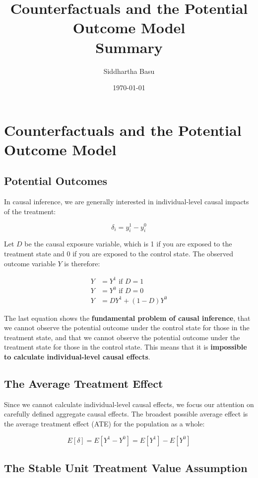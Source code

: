 \documentclass[12 pt, leqno]{article}
\begin{document}
\title{Counterfactuals and the Potential Outcome Model \\ Summary}
\author{Siddhartha Basu}
\date{\today}
\maketitle

\section{Counterfactuals and the Potential Outcome Model}
\subsection{Potential Outcomes}
In causal inference, we are generally interested in individual-level causal impacts of the treatment:

$$ \delta_i = y_i^1 - y_i^0 $$

Let $D$ be the causal exposure variable, which is 1 if you are exposed to the treatment state and 0 if you are exposed to the control state. The observed outcome variable $Y$ is therefore:

\begin{align*}
Y &= Y^1  \text{      if  } D = 1 \\
Y &= Y^0  \text{      if  } D = 0 \\
Y &= D Y^1 + (1 - D) Y^0
\end{align*}

The last equation shows the \textbf{fundamental problem of causal inference}, that we cannot observe the potential outcome under the control state for those in the treatment state, and that we cannot observe the potential outcome under the treatment state for those in the control state. This means that it is \textbf{impossible to calculate individual-level causal effects}.

\subsection{The Average Treatment Effect}

Since we cannot calculate individual-level causal effects, we focus our attention on carefully defined aggregate causal effects. The broadest possible average effect is the average treatment effect (ATE) for the population as a whole:

$$E[\delta] = E[Y^1 - Y^0] = E[Y^1] - E[Y^0]$$

\subsection{The Stable Unit Treatment Value Assumption}
\end{document}
